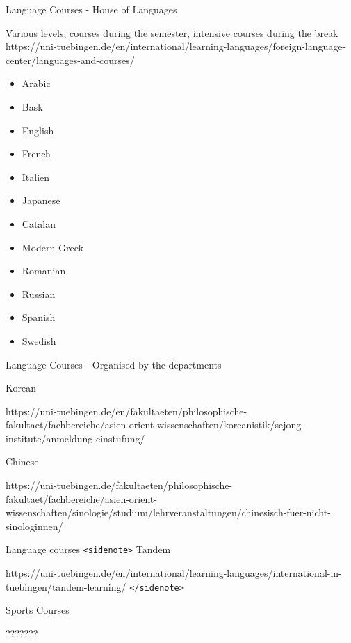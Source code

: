 \documentclass[aspectratio=169,hyperref={unicode}]{beamer}
\begin{document}
\begin{frame}{Language Courses - House of Languages}

Various levels, courses during the semester, intensive courses during the break
https://uni-tuebingen.de/en/international/learning-languages/foreign-language-center/languages-and-courses/


\begin{itemize}
\item Arabic
\item Bask
\item English
\item French
\item Italien
\item Japanese
\item Catalan
\item Modern Greek
\item Romanian
\item Russian
\item Spanish
\item Swedish
\end{itemize}
\end{frame}

\begin{frame}{Language Courses - Organised by the departments}

\begin{block}{Korean}

https://uni-tuebingen.de/en/fakultaeten/philosophische-fakultaet/fachbereiche/asien-orient-wissenschaften/koreanistik/sejong-institute/anmeldung-einstufung/
\end{block}	

\begin{block}{Chinese}

https://uni-tuebingen.de/fakultaeten/philosophische-fakultaet/fachbereiche/asien-orient-wissenschaften/sinologie/studium/lehrveranstaltungen/chinesisch-fuer-nicht-sinologinnen/
\end{block}	

\end{frame}

\begin{frame}{Language courses}
\texttt{<sidenote>}
Tandem

https://uni-tuebingen.de/en/international/learning-languages/international-in-tuebingen/tandem-learning/
\texttt{</sidenote>}	
\end{frame}


\begin{frame}{Sports Courses}

???????


\end{frame}
\end{document}
